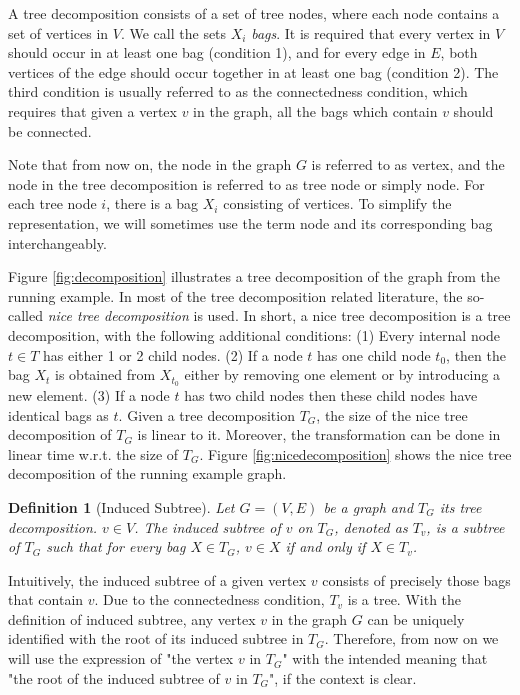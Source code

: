 \documentclass[preprint,12pt]{elsarticle}
\newtheorem{definition}{Definition}
\begin{document}
A tree decomposition consists of a set of tree nodes, where each node contains a set of vertices in $V$. We call the sets $X_i$ \emph {bags}. It is required that every vertex in $V$ should occur in at least one bag (condition 1), and for every edge in $E$, both vertices of the edge should occur together in at least one bag (condition 2). The third condition is usually referred to as the connectedness condition, which requires that given a vertex $v$ in the graph, all the bags which contain $v$ should be connected.

Note that from now on, the node in the graph $G$ is referred to as vertex, and the node in the tree decomposition is referred to as tree node or simply node. For each tree node $i$, there is a bag $X_i$ consisting of vertices. To simplify the representation, we will sometimes use the term node and its corresponding bag interchangeably. 






Figure \ref{fig:decomposition} illustrates a tree decomposition of the graph from the running example.
In most of the tree decomposition related literature, the so-called \emph{nice tree decomposition}
 is used. In short, a nice tree decomposition is a tree decomposition, with 
 the following additional conditions:
(1) Every internal node $t \in T$ has either 1 or 2 child nodes.
(2) If a node $t$ has one child node $t_0$, then the bag $X_t$ is obtained from $X_{t_0}$ either
by removing one element or by introducing a new element. (3) If a node $t$ has two
child nodes then these child nodes have identical bags as $t$.
Given a tree decomposition $T_G$,  the size of the  nice tree decomposition of 
$T_G$ is linear to it. Moreover, the transformation can be done in linear time
w.r.t. the size of $T_G$. 
Figure \ref{fig:nicedecomposition} shows the nice tree decomposition of the running example graph. 








\begin{definition} [Induced Subtree]
Let $G=(V,E)$ be a graph and $T_G$ its tree decomposition. $v \in V$. 
The induced subtree of $v$ on $T_G$,
denoted as $T_v$, is a subtree of $T_G$ such that
for every bag $X \in T_G$,  
$v \in X$ if and only if $X \in T_v$.
\end{definition}

Intuitively, the induced subtree of a given vertex $v$ consists of precisely those bags that contain $v$.
Due to the connectedness condition, $T_v$ is a tree.
With the definition of induced subtree, any vertex $v$ in the graph $G$ can be uniquely
identified with the root of its induced subtree in $T_G$.
Therefore, from now on we will use the expression of "the vertex $v$ in $T_G$" with the intended meaning
that "the root of the induced subtree of $v$ in $T_G$", if the context is clear.
\end{document}

